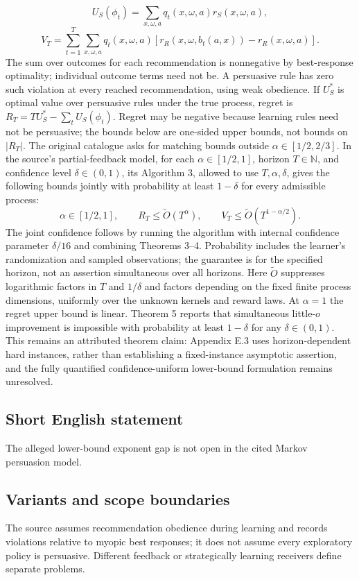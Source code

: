 \documentclass[11pt,a4paper]{article}
\newcommand{\N}{\mathbb N}
\begin{document}
\[
 U_S(\phi_t)=\sum_{x,\omega,a}q_t(x,\omega,a)r_S(x,\omega,a),
\]
\[
 V_T=\sum_{t=1}^T\sum_{x,\omega,a}q_t(x,\omega,a)
 [r_R(x,\omega,b_t(a,x))-r_R(x,\omega,a)].
\]
The sum over outcomes for each recommendation is nonnegative by best-response optimality; individual outcome terms need not be. A persuasive rule has zero such violation at every reached recommendation, using weak obedience. If $U_S^*$ is optimal value over persuasive rules under the true process, regret is $R_T=T U_S^*-\sum_tU_S(\phi_t)$. Regret may be negative because learning rules need not be persuasive; the bounds below are one-sided upper bounds, not bounds on $|R_T|$. The original catalogue asks for matching bounds outside $\alpha\in[1/2,2/3]$. In the source's partial-feedback model, for each $\alpha\in[1/2,1]$, horizon $T\in\N$, and confidence level $\delta\in(0,1)$, its Algorithm 3, allowed to use $T,\alpha,\delta$, gives the following bounds jointly with probability at least $1-\delta$ for every admissible process:
\[
 \alpha\in[1/2,1],\qquad
 R_T\leq\widetilde O(T^\alpha),\qquad V_T\leq\widetilde O(T^{1-\alpha/2}).
\]
The joint confidence follows by running the algorithm with internal confidence parameter $\delta/16$ and combining Theorems 3--4. Probability includes the learner's randomization and sampled observations; the guarantee is for the specified horizon, not an assertion simultaneous over all horizons. Here $\widetilde O$ suppresses logarithmic factors in $T$ and $1/\delta$ and factors depending on the fixed finite process dimensions, uniformly over the unknown kernels and reward laws. At $\alpha=1$ the regret upper bound is linear. Theorem 5 reports that simultaneous little-$o$ improvement is impossible with probability at least $1-\delta$ for any $\delta\in(0,1)$. This remains an attributed theorem claim: Appendix E.3 uses horizon-dependent hard instances, rather than establishing a fixed-instance asymptotic assertion, and the fully quantified confidence-uniform lower-bound formulation remains unresolved.
\subsection*{Short English statement}
The alleged lower-bound exponent gap is not open in the cited Markov persuasion model.
\subsection*{Variants and scope boundaries}
The source assumes recommendation obedience during learning and records violations relative to myopic best responses; it does not assume every exploratory policy is persuasive. Different feedback or strategically learning receivers define separate problems.
\end{document}
